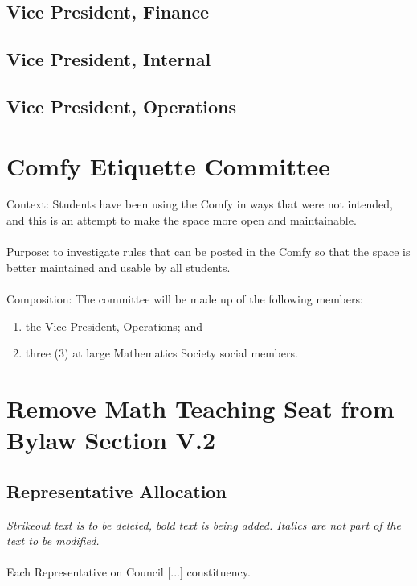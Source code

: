 \documentclass[12pt, letterpaper]{article}
\begin{document}
\subsection*{Vice President, Finance}


\subsection*{Vice President, Internal}


\subsection*{Vice President, Operations}


\newpage
{}
\section*{Comfy Etiquette Committee}
Context: Students have been using the Comfy in ways that were not intended, and this is an attempt to make the space more open and maintainable.  \\\\
Purpose: to investigate rules that can be posted in the Comfy so that the space is better maintained and usable by all students. \\\\
Composition: The committee will be made up of the following members:
\begin{enumerate}
	\item the Vice President, Operations; and
	\item three (3) at large Mathematics Society social members.
\end{enumerate}

\newpage
{}
\section*{Remove Math Teaching Seat from Bylaw Section V.2}
\subsection*{Representative Allocation}
\textit{Strikeout text is to be deleted, bold text is being added. Italics are not part of the text to be modified.}\\\\
Each Representative on Council [...] constituency.
\end{document}
